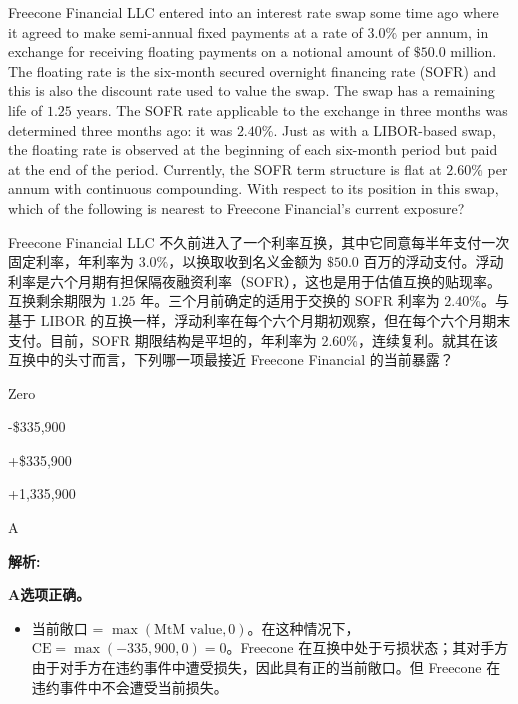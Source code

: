 \documentclass{article}
\newcounter{question} %
\newenvironment{explanation}
{\textbf{解析:}\par}
{\par}
\begin{document}
\begin{question}
    Freecone Financial LLC entered into an interest rate swap some time ago where it agreed to make semi-annual fixed payments at a rate of $3.0\%$ per annum, in exchange for receiving floating payments on a notional amount of $\$50.0$ million. The floating rate is the six-month secured overnight financing rate (SOFR) and this is also the discount rate used to value the swap. The swap has a remaining life of $1.25$ years. The SOFR rate applicable to the exchange in three months was determined three months ago: it was $2.40\%$. Just as with a LIBOR-based swap, the floating rate is observed at the beginning of each six-month period but paid at the end of the period. Currently, the SOFR term structure is flat at $2.60\%$ per annum with continuous compounding. With respect to its position in this swap, which of the following is nearest to Freecone Financial’s current exposure?

    Freecone Financial LLC 不久前进入了一个利率互换，其中它同意每半年支付一次固定利率，年利率为 $3.0\%$，以换取收到名义金额为 $\$50.0$ 百万的浮动支付。浮动利率是六个月期有担保隔夜融资利率（SOFR），这也是用于估值互换的贴现率。互换剩余期限为 $1.25$ 年。三个月前确定的适用于交换的 SOFR 利率为 $2.40\%$。与基于 LIBOR 的互换一样，浮动利率在每个六个月期初观察，但在每个六个月期末支付。目前，SOFR 期限结构是平坦的，年利率为 $2.60\%$，连续复利。就其在该互换中的头寸而言，下列哪一项最接近 Freecone Financial 的当前暴露？

\end{question}

\begin{choices}
    \item Zero
    \item -\$335,900
    \item +\$335,900
    \item +1,335,900
\end{choices}

\begin{correctanswer}
    A
\end{correctanswer}

\begin{explanation}
    \textbf{A选项正确。} 
    \begin{itemize}
        \item 当前敞口 = $\max(\text{MtM value}, 0)$。在这种情况下，$\text{CE} = \max(-335,900, 0) = 0$。Freecone 在互换中处于亏损状态；其对手方由于对手方在违约事件中遭受损失，因此具有正的当前敞口。但 Freecone 在违约事件中不会遭受当前损失。
    \end{itemize}
\end{explanation}
\end{document}
